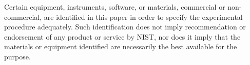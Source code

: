 \begin{titlepage}

\begin{flushleft}
\tagpdfparaOn
\footnotesize  Certain equipment, instruments, software, or materials, commercial or non-commercial, are identified in this paper in order to specify the experimental procedure adequately. Such identification does not imply recommendation or endorsement of any product or service by NIST, nor does it imply that the materials or equipment identified are necessarily the best available for the purpose.\\ 

\end{flushleft}
\end{titlepage}
